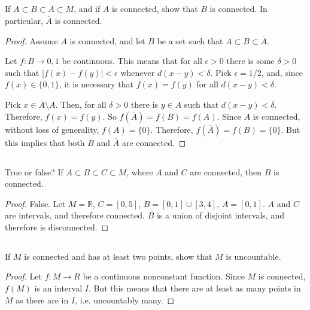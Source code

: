 \subsection{} If $A \subset B \subset \overline{A} \subset M$, and if $A$ is connected, show that $B$ is connected. In particular, $\overline{A}$ is connected.

\begin{proof}
Assume $A$ is connected, and let $B$ be a set such that $A \subset B \subset \overline{A}$.

Let $f: B \rightarrow {0,1}$ be continuous. This means that for all $\epsilon > 0$ there is some $\delta > 0$ such that $|f(x)-f(y)| < \epsilon$ whenever $d(x-y) < \delta$. Pick $\epsilon = 1/2$, and, since $f(x) \in \{0,1\}$, it is necessary that $f(x) = f(y)$ for all $d(x - y) < \delta$. 

Pick $x \in \overline{A} \setminus A$. Then, for all $\delta > 0$ there is $y \in A$ such that $d(x-y)<\delta$. Therefore, $f(x) = f(y)$. So $f(\overline{A}) = f(B) = f(A)$. Since $A$ is connected, without loss of generality, $f(A) = \{0\}$. Therefore, $f(\overline{A}) = f(B) = \{0\}$. But this implies that both $B$ and $\overline{A}$ are connected.


\end{proof}

\subsection{} True or false? If $A \subset B \subset C 
\subset M$, where $A$ and $C$ are connected, then $B$ is connected. 

\begin{proof}
False. Let $M = \mathbb{R}$, $C = [0,5]$, $B = [0,1] \cup [3,4]$, $A = [0,1]$. $A$ and $C$ are intervals, and therefore connected. $B$ is a union of disjoint intervals, and therefore is disconnected.
\end{proof}

\subsection{} If $M$ is connected and has at least two points, show that $M$ is uncountable.

\begin{proof}
Let $f:M \rightarrow R$ be a continuous nonconstant function. Since $M$ is connected, $f(M)$ is an interval $I$. But this means that there are at least as many points in $M$ as there are in $I$, i.e. uncountably many.
\end{proof}


